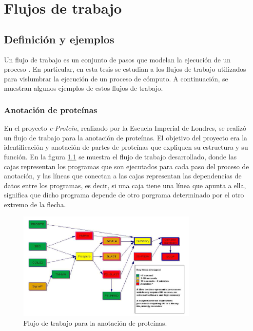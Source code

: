\chapter{Flujos de trabajo}
\label{chap:workflows}

\section{Definición y ejemplos}
Un flujo de trabajo es un conjunto de pasos que modelan la ejecución de un proceso \cite{gutierrez2012agent}.
En particular, en esta tesis se estudian a los flujos de trabajo utilizados para vislumbrar la ejecución de un proceso de cómputo. A continuación, se muestran algunos ejemplos de estos flujos de trabajo.

\subsection{Anotación de proteínas}
En el proyecto \emph{e-Protein}, realizado por la Escuela Imperial de Londres, se realizó un flujo de trabajo para la anotación de proteínas. El objetivo del proyecto \cite{o2004mapping} era la identificación y anotación de partes de proteínas que expliquen su estructura y su función. En la figura \ref{fig:iceni-workflow} se muestra el flujo de trabajo desarrollado, donde las cajas representan los programas que son ejecutados para cada paso del proceso de anotación, y las líneas que conectan a las cajas representan las dependencias de datos entre los programas, es decir, si una caja tiene una línea que apunta a ella, significa que dicho programa depende de otro porgrama determinado por el otro extremo de la flecha.

\begin{figure}
    \begin{center}
        \includegraphics[width=0.8\textwidth]{imagenes/iceni-workflow}
    \end{center}
    \caption{Flujo de trabajo para la anotación de proteínas.}
    \label{fig:iceni-workflow}
\end{figure}


